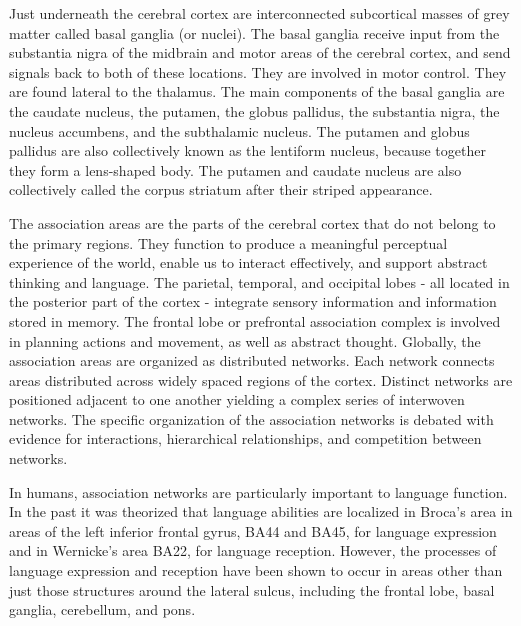 \documentclass[]{book}
\begin{document}
Just underneath the cerebral cortex are interconnected subcortical masses of grey matter called basal ganglia (or nuclei). The basal ganglia receive input from the substantia nigra of the midbrain and motor areas of the cerebral cortex, and send signals back to both of these locations. They are involved in motor control. They are found lateral to the thalamus. The main components of the basal ganglia are the caudate nucleus, the putamen, the globus pallidus, the substantia nigra, the nucleus accumbens, and the subthalamic nucleus. The putamen and globus pallidus are also collectively known as the lentiform nucleus, because together they form a lens-shaped body. The putamen and caudate nucleus are also collectively called the corpus striatum after their striped appearance.

The association areas are the parts of the cerebral cortex that do not belong to the primary regions. They function to produce a meaningful perceptual experience of the world, enable us to interact effectively, and support abstract thinking and language. The parietal, temporal, and occipital lobes - all located in the posterior part of the cortex - integrate sensory information and information stored in memory. The frontal lobe or prefrontal association complex is involved in planning actions and movement, as well as abstract thought. Globally, the association areas are organized as distributed networks. Each network connects areas distributed across widely spaced regions of the cortex. Distinct networks are positioned adjacent to one another yielding a complex series of interwoven networks. The specific organization of the association networks is debated with evidence for interactions, hierarchical relationships, and competition between networks.

In humans, association networks are particularly important to language function. In the past it was theorized that language abilities are localized in Broca's area in areas of the left inferior frontal gyrus, BA44 and BA45, for language expression and in Wernicke's area BA22, for language reception. However, the processes of language expression and reception have been shown to occur in areas other than just those structures around the lateral sulcus, including the frontal lobe, basal ganglia, cerebellum, and pons.
\end{document}
